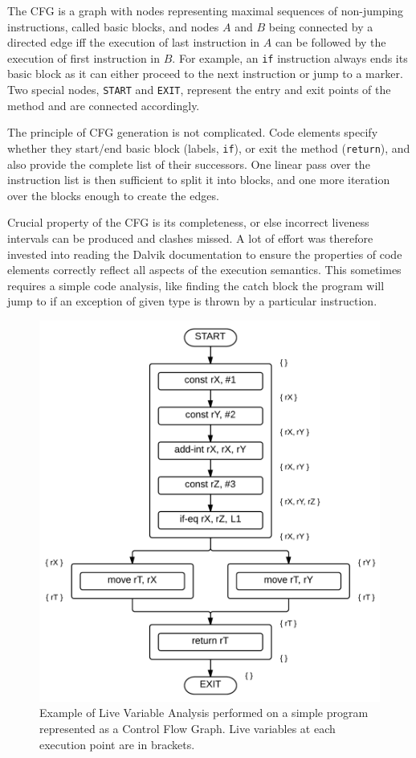 \documentclass[12pt,twoside,notitlepage]{report}
\begin{document}
The CFG is a graph with nodes representing maximal sequences of non-jumping instructions, called basic blocks, and nodes $A$ and $B$ being connected by a directed edge iff the execution of last instruction in $A$ can be followed by the execution of first instruction in $B$. For example, an \verb$if$ instruction always ends its basic block as it can either proceed to the next instruction or jump to a marker. Two special nodes, \verb$START$ and \verb$EXIT$, represent the entry and exit points of the method and are connected accordingly.

The principle of CFG generation is not complicated. Code elements specify whether they start/end basic block (labels, \verb$if$), or exit the method (\verb$return$), and also provide the complete list of their successors. One linear pass over the instruction list is then sufficient to split it into blocks, and one more iteration over the blocks enough to create the edges.

Crucial property of the CFG is its completeness, or else incorrect liveness intervals can be produced and clashes missed. A lot of effort was therefore invested into reading the Dalvik documentation to ensure the properties of code elements correctly reflect all aspects of the execution semantics. This sometimes requires a simple code analysis, like finding the catch block the program will jump to if an exception of given type is thrown by a particular instruction. 

\begin{figure}
	\centerline{	
		\includegraphics[height=0.42\textheight]{figs/fig_implementation_lva.png}
	}
	\caption{Example of Live Variable Analysis performed on a simple program represented as a Control Flow Graph. Live variables at each execution point are in brackets.}
	\label{fig:Implementation_LVA}
\end{figure}
\end{document}
